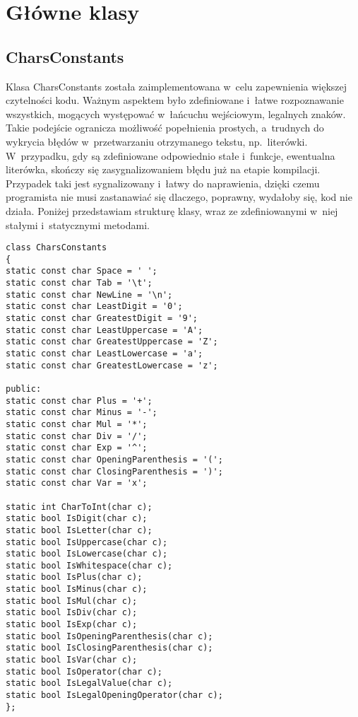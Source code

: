 \section{Główne klasy}

\subsection{CharsConstants}

Klasa CharsConstants została zaimplementowana w~celu zapewnienia większej czytelności kodu. Ważnym aspektem było zdefiniowane i~łatwe rozpoznawanie wszystkich, mogących występować w~łańcuchu wejściowym, legalnych znaków. Takie podejście ogranicza możliwość popełnienia prostych, a~trudnych do wykrycia błędów w~przetwarzaniu otrzymanego tekstu, np.\ literówki. W~przypadku, gdy są zdefiniowane odpowiednio stałe i~funkcje, ewentualna literówka, skończy się zasygnalizowaniem błędu już na etapie kompilacji. Przypadek taki jest sygnalizowany i~łatwy do naprawienia, dzięki czemu programista nie musi zastanawiać się dlaczego, poprawny, wydałoby się, kod nie działa. Poniżej przedstawiam strukturę klasy, wraz ze zdefiniowanymi w~niej stałymi i~statycznymi metodami. 

\begin{lstlisting}
class CharsConstants
{
static const char Space = ' ';
static const char Tab = '\t';
static const char NewLine = '\n';
static const char LeastDigit = '0';
static const char GreatestDigit = '9';
static const char LeastUppercase = 'A';
static const char GreatestUppercase = 'Z';
static const char LeastLowercase = 'a';
static const char GreatestLowercase = 'z';

public:
static const char Plus = '+';
static const char Minus = '-';
static const char Mul = '*';
static const char Div = '/';
static const char Exp = '^';
static const char OpeningParenthesis = '(';
static const char ClosingParenthesis = ')';
static const char Var = 'x';

static int CharToInt(char c);
static bool IsDigit(char c);
static bool IsLetter(char c);
static bool IsUppercase(char c);
static bool IsLowercase(char c);
static bool IsWhitespace(char c);
static bool IsPlus(char c);
static bool IsMinus(char c);
static bool IsMul(char c);
static bool IsDiv(char c);
static bool IsExp(char c);
static bool IsOpeningParenthesis(char c);
static bool IsClosingParenthesis(char c);
static bool IsVar(char c);
static bool IsOperator(char c);
static bool IsLegalValue(char c);
static bool IsLegalOpeningOperator(char c);
};
\end{lstlisting}



